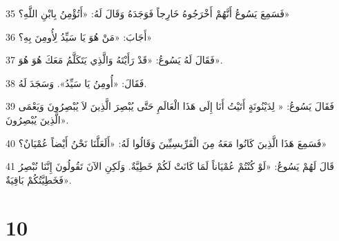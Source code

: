 \par 35 فَسَمِعَ يَسُوعُ أَنَّهُمْ أَخْرَجُوهُ خَارِجاً فَوَجَدَهُ وَقَالَ لَهُ: «أَتُؤْمِنُ بِابْنِ اللَّهِ؟»
\par 36 أَجَابَ: «مَنْ هُوَ يَا سَيِّدُ لِأُومِنَ بِهِ؟»
\par 37 فَقَالَ لَهُ يَسُوعُ: «قَدْ رَأَيْتَهُ وَالَّذِي يَتَكَلَّمُ مَعَكَ هُوَ هُوَ».
\par 38 فَقَالَ: «أُومِنُ يَا سَيِّدُ». وَسَجَدَ لَهُ.
\par 39 فَقَالَ يَسُوعُ: « لِدَيْنُونَةٍ أَتَيْتُ أَنَا إِلَى هَذَا الْعَالَمِ حَتَّى يُبْصِرَ الَّذِينَ لاَ يُبْصِرُونَ وَيَعْمَى الَّذِينَ يُبْصِرُونَ».
\par 40 فَسَمِعَ هَذَا الَّذِينَ كَانُوا مَعَهُ مِنَ الْفَرِّيسِيِّينَ وَقَالُوا لَهُ: «أَلَعَلَّنَا نَحْنُ أَيْضاً عُمْيَانٌ؟»
\par 41 قَالَ لَهُمْ يَسُوعُ: «لَوْ كُنْتُمْ عُمْيَاناً لَمَا كَانَتْ لَكُمْ خَطِيَّةٌ. وَلَكِنِ الآنَ تَقُولُونَ إِنَّنَا نُبْصِرُ فَخَطِيَّتُكُمْ بَاقِيَةٌ».

\chapter{10}

